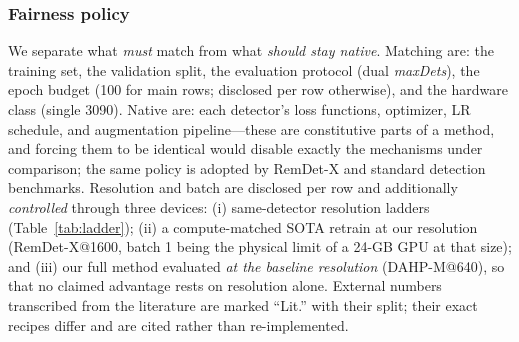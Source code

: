 \documentclass[journal]{IEEEtran}
\newcommand{\remdet}{RemDet-X}
\begin{document}
\subsubsection{Fairness policy}
We separate what \emph{must} match from what \emph{should stay native}. Matching are: the training set, the validation split, the evaluation protocol (dual \emph{maxDets}), the epoch budget (100 for main rows; disclosed per row otherwise), and the hardware class (single 3090). Native are: each detector's loss functions, optimizer, LR schedule, and augmentation pipeline---these are constitutive parts of a method, and forcing them to be identical would disable exactly the mechanisms under comparison; the same policy is adopted by \remdet{} \cite{remdet} and standard detection benchmarks. Resolution and batch are disclosed per row and additionally \emph{controlled} through three devices: (i) same-detector resolution ladders (Table~\ref{tab:ladder}); (ii) a compute-matched SOTA retrain at our resolution (\remdet{}@1600, batch 1 being the physical limit of a 24-GB GPU at that size); and (iii) our full method evaluated \emph{at the baseline resolution} (DAHP-M@640), so that no claimed advantage rests on resolution alone. External numbers transcribed from the literature are marked ``Lit.'' with their split; their exact recipes differ and are cited rather than re-implemented.
\end{document}
